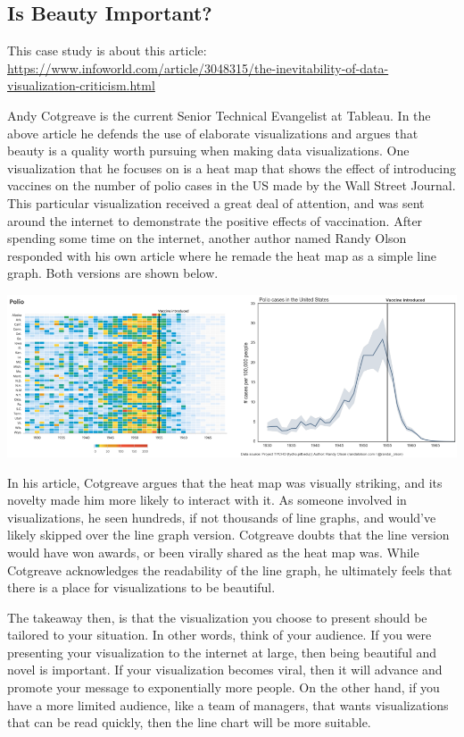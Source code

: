 \documentclass[]{book}
\begin{document}
\hypertarget{is-beauty-important}{%
\subsection{Is Beauty Important?}\label{is-beauty-important}}

This case study is about this article: \url{https://www.infoworld.com/article/3048315/the-inevitability-of-data-visualization-criticism.html}

Andy Cotgreave is the current Senior Technical Evangelist at Tableau. In the above article he defends the use of elaborate visualizations and argues that beauty is a quality worth pursuing when making data visualizations.
One visualization that he focuses on is a heat map that shows the effect of introducing vaccines on the number of polio cases in the US made by the Wall Street Journal. This particular visualization received a great deal of attention, and was sent around the internet to demonstrate the positive effects of vaccination. After spending some time on the internet, another author named Randy Olson responded with his own article where he remade the heat map as a simple line graph. Both versions are shown below.

\includegraphics{images/which_is_best.png}

In his article, Cotgreave argues that the heat map was visually striking, and its novelty made him more likely to interact with it. As someone involved in visualizations, he seen hundreds, if not thousands of line graphs, and would've likely skipped over the line graph version. Cotgreave doubts that the line version would have won awards, or been virally shared as the heat map was. While Cotgreave acknowledges the readability of the line graph, he ultimately feels that there is a place for visualizations to be beautiful.

The takeaway then, is that the visualization you choose to present should be tailored to your situation. In other words, think of your audience. If you were presenting your visualization to the internet at large, then being beautiful and novel is important. If your visualization becomes viral, then it will advance and promote your message to exponentially more people. On the other hand, if you have a more limited audience, like a team of managers, that wants visualizations that can be read quickly, then the line chart will be more suitable.
\end{document}
